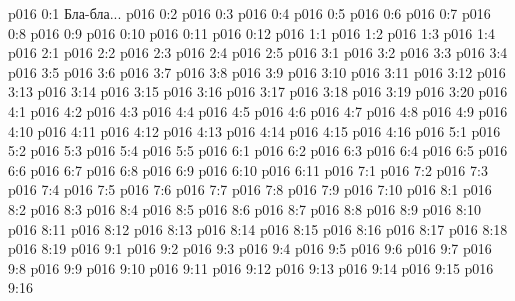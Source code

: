 \author{Всеобщий Цензор}
\vs p016 0:1  Бла-бла...
\vs p016 0:2 
\vs p016 0:3 
\vs p016 0:4 
\vs p016 0:5 
\vs p016 0:6 
\vs p016 0:7 
\vs p016 0:8 
\vs p016 0:9 
\vs p016 0:10 \pc 
\vs p016 0:11 
\vs p016 0:12 
\vs p016 1:1 
\vs p016 1:2 
\vs p016 1:3 
\vs p016 1:4 
\vs p016 2:1 
\vs p016 2:2 
\vs p016 2:3 \pc 
\vs p016 2:4 \pc 
\vs p016 2:5 
\vs p016 3:1 
\vs p016 3:2 
\vs p016 3:3 
\vs p016 3:4 \pc 
\vs p016 3:5 
\vs p016 3:6 \pc 
\vs p016 3:7 
\vs p016 3:8 \pc 
\vs p016 3:9 
\vs p016 3:10 \pc 
\vs p016 3:11 
\vs p016 3:12 \pc 
\vs p016 3:13 
\vs p016 3:14 \pc 
\vs p016 3:15 
\vs p016 3:16 
\vs p016 3:17 
\vs p016 3:18 
\vs p016 3:19 
\vs p016 3:20 
\vs p016 4:1 
\vs p016 4:2 
\vs p016 4:3 
\vs p016 4:4 
\vs p016 4:5 
\vs p016 4:6 
\vs p016 4:7 
\vs p016 4:8 \pc 
\vs p016 4:9 
\vs p016 4:10 
\vs p016 4:11 
\vs p016 4:12 
\vs p016 4:13 
\vs p016 4:14 
\vs p016 4:15 
\vs p016 4:16 \pc 
{}
\vs p016 5:1 
\vs p016 5:2 
\vs p016 5:3 
\vs p016 5:4 
\vs p016 5:5 
\vs p016 6:1 
\vs p016 6:2 
\vs p016 6:3 
\vs p016 6:4 \pc 
\vs p016 6:5 
\vs p016 6:6 
\vs p016 6:7 
\vs p016 6:8 
\vs p016 6:9 \pc 
\vs p016 6:10 \pc 
\vs p016 6:11 
\vs p016 7:1 
\vs p016 7:2 
\vs p016 7:3 
\vs p016 7:4 
\vs p016 7:5 
\vs p016 7:6 \pc 
\vs p016 7:7 
\vs p016 7:8 \pc 
\vs p016 7:9 \pc 
\vs p016 7:10 
\vs p016 8:1 
\vs p016 8:2 
\vs p016 8:3 
\vs p016 8:4 
\vs p016 8:5 \pc 
\vs p016 8:6 
\vs p016 8:7 \pc 
\vs p016 8:8 
\vs p016 8:9 
\vs p016 8:10 
\vs p016 8:11 
\vs p016 8:12 
\vs p016 8:13 
\vs p016 8:14 
\vs p016 8:15 \pc 
\vs p016 8:16 
\vs p016 8:17 
\vs p016 8:18 
\vs p016 8:19 \pc 
{}
\vs p016 9:1 
\vs p016 9:2 
\vs p016 9:3 
\vs p016 9:4 \pc 
\vs p016 9:5 
\vs p016 9:6 
\vs p016 9:7 \pc 
\vs p016 9:8 
\vs p016 9:9 
\vs p016 9:10 
\vs p016 9:11 
\vs p016 9:12 
\vs p016 9:13 
\vs p016 9:14 \pc 
\vs p016 9:15 
\vsetoff
\vs p016 9:16 
\quizlink
